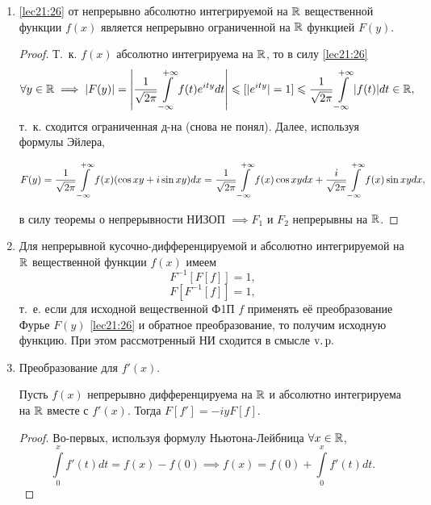 \documentclass[../../main.tex]{subfiles}
\begin{document}
\begin{enumerate}
  \item \eqref{lec21:26} от непрерывно абсолютно интегрируемой на $\mathbb{R}$ 
  вещественной функции $f(x)$ является непрерывно ограниченной на $\mathbb{R}$ 
  функцией 
  $F(y)$.
  \begin{proof}
    Т.~к. $f(x)$ абсолютно интегрируема на $\mathbb{R}$, то в силу \eqref{lec21:26}
    \begin{multline*}
      \forall y \in \mathbb{R} \implies |F(y)| = \left|\frac{1}{\sqrt{2\pi}} \int\limits_{-\infty}^{+\infty} 
      f(t)e^{ity}dt\right| \leqslant [|e^{ity}| = 1] \leqslant \frac{1}{\sqrt{2\pi}} 
      \int\limits_{-\infty}^{+\infty}|f(t)|dt \in \mathbb{R},
    \end{multline*}
    т.~к. сходится ограниченная д-на (снова не понял). Далее, используя 
    формулы Эйлера,
    
    \begin{multline*}
      F(y) = \frac{1}{\sqrt{2\pi}} \int\limits_{-\infty}^{+\infty} f(x) (\cos xy + i\sin xy)dx = 
      \frac{1}{\sqrt{2\pi}} \int\limits_{-\infty}^{+\infty} f(x) \cos xy dx + \frac{i}{\sqrt{2\pi}} 
      \int\limits_{-\infty}^{+\infty} f(x) \sin xy dx,
    \end{multline*}
    
    в силу теоремы о непрерывности НИЗОП $\implies F_1$ и $F_2$ непрерывны на 
    $\mathbb{R}$.
  \end{proof}
  
  \item Для непрерывной кусочно-дифференцируемой и абсолютно интегрируемой 
  на $\mathbb{R}$ вещественной функции $f(x)$ имеем  \[F^{-1}[F[f]] = 1,\] 
  \[F[F^{-1}[f]] = 1,\] т.~е. если для исходной вещественной Ф1П $f$ 
  применять её преобразование Фурье $F(y)$ \eqref{lec21:26} и обратное 
  преобразование, то получим исходную функцию. При этом рассмотренный НИ 
  сходится в смысле $\operatorname{v.p.}$
  
  \item Преобразование для $f'(x)$.
  
  Пусть $f(x)$ непрерывно дифференцируема на $\mathbb{R}$ и абсолютно интегрируема 
  на $\mathbb{R}$ вместе с $f'(x)$. Тогда $F[f'] = -iyF[f]$.
  
  \begin{proof}
    Во-первых, используя формулу Ньютона-Лейбница $\forall x \in \mathbb{R}$,
    \begin{equation}
      \label{lec21:28}
      \int\limits_{0}^{x}f
      '(t)dt = f(x) - f(0) \implies f(x) = f(0) + \int\limits_{0}^{x}f'(t)dt.
    \end{equation}
    

\end{proof}
\end{enumerate}
\end{document}
